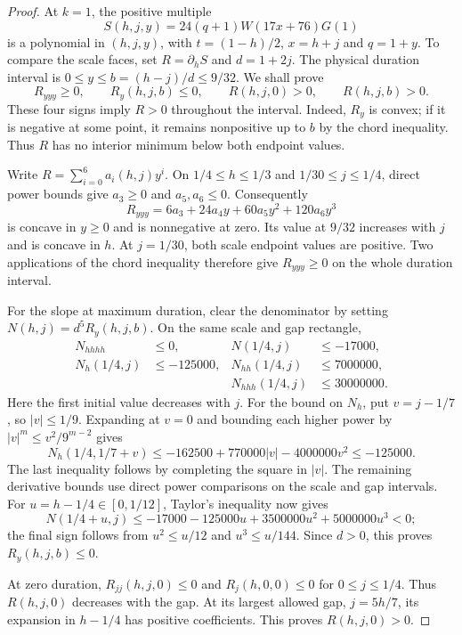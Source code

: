 \begin{proof}
At $k=1$, the positive multiple
\[
 S(h,j,y)=24(q+1)W(17x+76)G(1)
\]
is a polynomial in $(h,j,y)$, with $t=(1-h)/2$, $x=h+j$ and $q=1+y$.
To compare the scale faces, set $R=\partial_hS$ and $d=1+2j$.
The physical duration interval is $0\le y\le b=(h-j)/d\le9/32$.
We shall prove
\[
 R_{yyy}\ge0,\qquad R_y(h,j,b)\le0,\qquad
 R(h,j,0)>0,\qquad R(h,j,b)>0.
\]
These four signs imply $R>0$ throughout the interval. Indeed, $R_y$ is convex;
if it is negative at some point, it remains nonpositive up to $b$ by the chord
inequality. Thus $R$ has no interior minimum below both endpoint values.

Write $R=\sum_{i=0}^6a_i(h,j)y^i$. On
$1/4\le h\le1/3$ and $1/30\le j\le1/4$, direct power bounds give
$a_3\ge0$ and $a_5,a_6\le0$. Consequently
\[
 R_{yyy}=6a_3+24a_4y+60a_5y^2+120a_6y^3
\]
is concave in $y\ge0$ and is nonnegative at zero. Its value at $9/32$
increases with $j$ and is concave in $h$. At $j=1/30$, both scale endpoint
values are positive. Two applications of the chord inequality therefore
give $R_{yyy}\ge0$ on the whole duration interval.

For the slope at maximum duration, clear the denominator by setting
$N(h,j)=d^5R_y(h,j,b)$. On the same scale and gap rectangle,
\begin{align*}
 N_{hhhh}&\le0, & N(1/4,j)&\le-17000,\\
 N_h(1/4,j)&\le-125000, & N_{hh}(1/4,j)&\le7000000,\\
 &&N_{hhh}(1/4,j)&\le30000000.
\end{align*}
Here the first initial value decreases with $j$. For the bound on $N_h$,
put $v=j-1/7$, so $|v|\le1/9$. Expanding at $v=0$ and bounding each higher
power by $|v|^m\le v^2/9^{m-2}$ gives
\[
 N_h(1/4,1/7+v)\le-162500+770000|v|-4000000v^2\le-125000.
\]
The last inequality follows by completing the square in $|v|$.
The remaining derivative bounds use direct power comparisons on the scale and gap intervals.
For $u=h-1/4\in[0,1/12]$, Taylor's inequality now gives
\[
 N(1/4+u,j)\le-17000-125000u+3500000u^2+5000000u^3<0;
\]
the final sign follows from $u^2\le u/12$ and $u^3\le u/144$.
Since $d>0$, this proves $R_y(h,j,b)\le0$.

At zero duration, $R_{jj}(h,j,0)\le0$ and $R_j(h,0,0)\le0$ for
$0\le j\le1/4$. Thus $R(h,j,0)$ decreases with the gap. At its largest
allowed gap, $j=5h/7$, its expansion in $h-1/4$ has positive coefficients.
This proves $R(h,j,0)>0$.


\end{proof}
